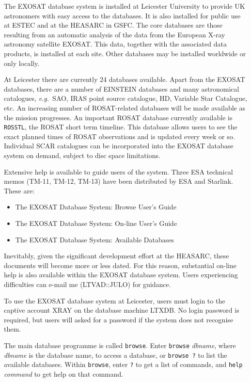 The EXOSAT database system is installed at Leicester University to provide
UK astronomers with easy access to the databases. It is also installed for
public use at
ESTEC and at the HEASARC in GSFC. The core databases are those resulting
from an automatic analysis of the data from the European X-ray astronomy
satellite EXOSAT. This data, together with the associated data products, is
installed at each site. Other databases may be installed worldwide or only
locally.

At Leicester there are currently 24 databases available. Apart from the
EXOSAT databases, there are a number of EINSTEIN databases and many
astronomical catalogues, {\it e.g.}~SAO,
IRAS point source catalogue, HD, Variable Star Catalogue, etc.
An increasing number of ROSAT-related
databases will be made available as the mission progresses. An important
ROSAT database currently available is {\tt ROSSTL},
the ROSAT short term timeline.
This database allows users to see the exact planned times of ROSAT
observations and is updated every week or so. Individual SCAR catalogues can
be incorporated into the EXOSAT database system on demand, subject to disc
space limitations.

Extensive help is available to guide users of the system. Three ESA
technical memos (TM-11, TM-12, TM-13) have been distributed by ESA and
Starlink. These are:
\begin{itemize}
\item The EXOSAT Database System: Browse User's Guide
\item The EXOSAT Database System: On-line User's Guide
\item The EXOSAT Database System: Available Databases
\end{itemize}
Inevitably, given the significant development effort at the HEASARC, these
documents will become more or less dated. For this reason, substantial
on-line help is also available within the EXOSAT database system. Users
experiencing difficulties can e-mail me (LTVAD::JULO) for guidance.

To use the EXOSAT database system at Leicester, users must login to the
captive account XRAY on the database machine LTXDB. No login password is
required, but users will asked for a password if the system does not recognise
them.

The main database programme is called {\tt browse}.
Enter {\tt browse} {\it dbname},
where {\it dbname} is the database name, to access a database, or {\tt browse ?}
to list the available databases. Within {\tt browse},
enter {\tt ?} to get a list
of commands, and {\tt help} {\it command} to get help on that command.

